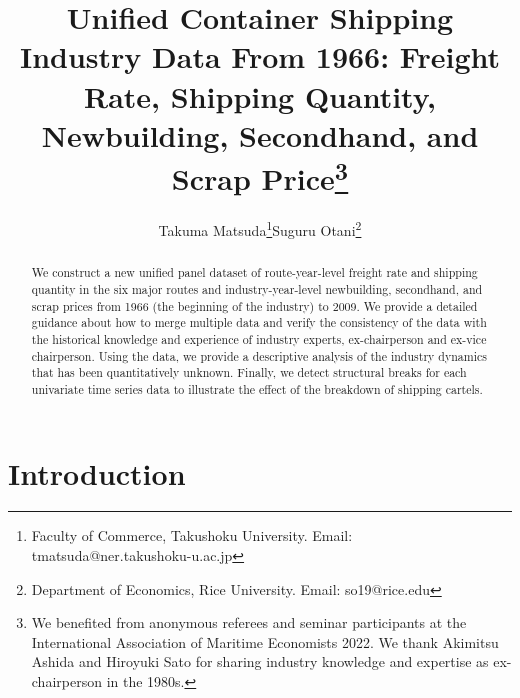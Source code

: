 \documentclass[11pt]{article}
\title{Unified Container Shipping Industry Data From 1966: Freight Rate, Shipping Quantity, Newbuilding, Secondhand, and Scrap Price\thanks{We benefited from anonymous referees and seminar participants at the International Association of Maritime Economists 2022. We thank Akimitsu Ashida and Hiroyuki Sato for sharing industry knowledge and expertise as ex-chairperson in the 1980s.}}
\author{Takuma Matsuda\thanks{Faculty of Commerce, Takushoku University. Email: tmatsuda@ner.takushoku-u.ac.jp}\quad  Suguru Otani\thanks{Department of Economics, Rice University. Email: so19@rice.edu}}
\begin{document}
\maketitle

\begin{abstract}
We construct a new unified panel dataset of route-year-level freight rate and shipping quantity in the six major routes and industry-year-level newbuilding, secondhand, and scrap prices from 1966 (the beginning of the industry) to 2009. We provide a detailed guidance about how to merge multiple data and verify the consistency of the data with the historical knowledge and experience of industry experts, ex-chairperson and ex-vice chairperson. Using the data, we provide a descriptive analysis of the industry dynamics that has been quantitatively unknown. Finally, we detect structural breaks for each univariate time series data to illustrate the effect of the breakdown of shipping cartels.
\end{abstract} 


\section{Introduction}\label{sec:introduction}
\end{document}
